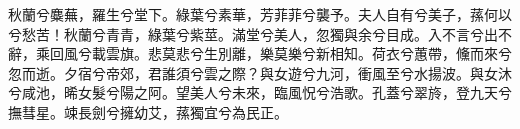 
\begin{pinyinscope}
秋蘭兮麋蕪，羅生兮堂下。綠葉兮素華，芳菲菲兮襲予。夫人自有兮美子，蓀何以兮愁苦！秋蘭兮青青，綠葉兮紫莖。滿堂兮美人，忽獨與余兮目成。入不言兮出不辭，乘回風兮載雲旗。悲莫悲兮生別離，樂莫樂兮新相知。荷衣兮蕙帶，儵而來兮忽而逝。夕宿兮帝郊，君誰須兮雲之際？與女遊兮九河，衝風至兮水揚波。與女沐兮咸池，晞女髮兮陽之阿。望美人兮未來，臨風怳兮浩歌。孔蓋兮翠旍，登九天兮撫彗星。竦長劍兮擁幼艾，蓀獨宜兮為民正。


\end{pinyinscope}
